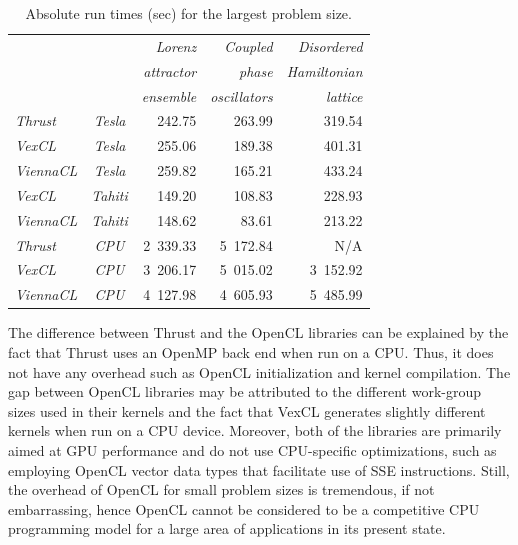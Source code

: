 \documentclass[final]{siamltex}
\begin{document}
\begin{table}
 \centering
    \caption{Absolute run times (sec) for the largest problem size.}
    \label{tab:abstimes}
    \begin{tabular}{|lc|rrr|}
        \hline
        & & \em Lorenz    & \em Coupled     & \em Disordered  \\
        & & \em attractor & \em phase       & \em Hamiltonian \\
        & & \em ensemble  & \em oscillators & \em lattice     \\
        \hline
        \em Thrust   &\em Tesla & 242.75 & 263.99 & 319.54 \\
        \em VexCL    &\em Tesla & 255.06 & 189.38 & 401.31 \\
        \em ViennaCL &\em Tesla & 259.82 & 165.21 & 433.24 \\
        \hline
        \em VexCL    &\em Tahiti & 149.20 & 108.83 & 228.93 \\
        \em ViennaCL &\em Tahiti & 148.62 &  83.61 & 213.22 \\
        \hline
        \em Thrust   &\em CPU   & 2~339.33 & 5~172.84 &      N/A \\
        \em VexCL    &\em CPU   & 3~206.17 & 5~015.02 & 3~152.92 \\
        \em ViennaCL &\em CPU   & 4~127.98 & 4~605.93 & 5~485.99 \\
        \hline
    \end{tabular}
\end{table}


The difference between Thrust and the OpenCL libraries can be explained by the fact
that Thrust uses an OpenMP back end when run on a CPU. Thus, it does not have any
overhead such as OpenCL initialization and kernel compilation.  The gap
between OpenCL libraries may be attributed to the different work-group sizes
used in their kernels and the fact that VexCL generates slightly different
kernels when run on a CPU device. Moreover, both of the libraries are primarily
aimed at GPU performance and do not use CPU-specific optimizations, such as
employing OpenCL vector data types that facilitate use of SSE instructions.
Still, the overhead of OpenCL for small problem sizes is tremendous, if not embarrassing,
hence OpenCL cannot be considered to be a competitive CPU programming model for a large area of applications in its present state.

\end{document}
